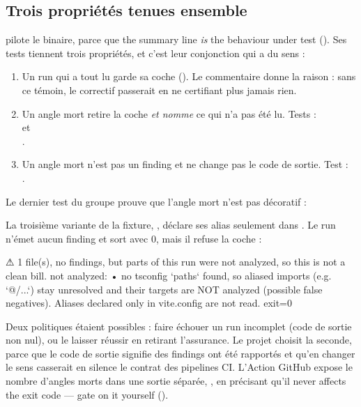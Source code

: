 \subsection{Trois propriétés tenues ensemble}

 pilote le binaire, parce que \og the summary line \emph{is} the behaviour under test\fg{} (). Ses tests tiennent trois propriétés, et c'est leur conjonction qui a du sens :


\begin{enumerate}
  \item Un run qui a tout lu garde sa coche (). Le commentaire donne la raison : sans ce témoin, le correctif \og passerait\fg{} en ne certifiant plus jamais rien.
  \item Un angle mort retire la coche \emph{et nomme} ce qui n'a pas été lu. Tests :\\  et\\ .
  \item Un angle mort n'est pas un finding et ne change pas le code de sortie. Test :\\ .
\end{enumerate}

Le dernier test du groupe prouve que l'angle mort n'est pas décoratif :


La troisième variante de la fixture, , déclare ses alias  seulement dans . Le run n'émet aucun finding et sort avec 0, mais il refuse la coche :

\begin{sortie}
⚠  1 file(s), no findings, but parts of this run were not analyzed, so this is not a clean bill.
   not analyzed:
     • no tsconfig `paths` found, so aliased imports (e.g. `@/...`) stay unresolved and their targets are NOT analyzed (possible false negatives). Aliases declared only in vite.config are not read.
exit=0
\end{sortie}

\begin{decision}
Deux politiques étaient possibles : faire échouer un run incomplet (code de sortie non nul), ou le laisser réussir en retirant l'assurance. Le projet choisit la seconde, parce que le code de sortie signifie \og des findings ont été rapportés\fg{} et qu'en changer le sens casserait en silence le contrat des pipelines CI. L'Action GitHub expose le nombre d'angles morts dans une sortie séparée, , en précisant qu'il \og never affects the exit code — gate on it yourself\fg{} ().
\end{decision}

